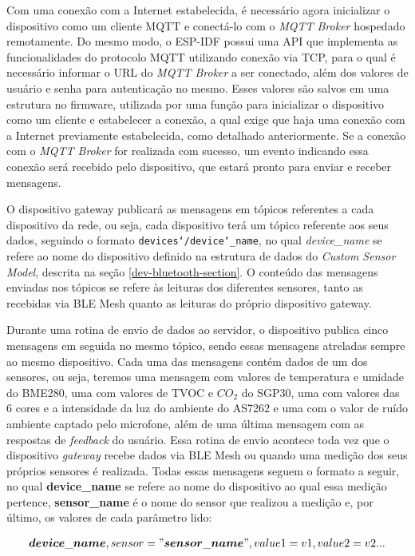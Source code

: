 \documentclass[../monografia.tex]{subfiles}
\begin{document}
Com uma conexão com a Internet estabelecida, é necessário agora inicializar o dispositivo como um cliente MQTT e conectá-lo com o \textit{MQTT Broker} hospedado remotamente. Do mesmo modo, o ESP-IDF possui uma API que implementa as funcionalidades do protocolo MQTT utilizando conexão via TCP, para o qual é necessário informar o URL do \textit{MQTT Broker} a ser conectado, além dos valores de usuário e senha para autenticação no mesmo. Esses valores são salvos em uma estrutura no firmware, utilizada por uma função para inicializar o dispositivo como um cliente e estabelecer a conexão, a qual exige que haja uma conexão com a Internet previamente estabelecida, como detalhado anteriormente. Se a conexão com o \textit{MQTT Broker} for realizada com sucesso, um evento indicando essa conexão será recebido pelo dispositivo, que estará pronto para enviar e receber mensagens.

O dispositivo gateway publicará as mensagens em tópicos referentes a cada dispositivo da rede, ou seja, cada dispositivo terá um tópico referente aos seus dados, seguindo o formato \texttt{devices\char`/device\char`_name}, no qual \textit{device\_name} se refere ao nome do dispositivo definido na estrutura de dados do \textit{Custom Sensor Model}, descrita na seção \ref{dev-bluetooth-section}. O conteúdo das mensagens enviadas nos tópicos se refere às leituras dos diferentes sensores, tanto as recebidas via BLE Mesh quanto as leituras do próprio dispositivo gateway.

Durante uma rotina de envio de dados ao servidor, o dispositivo publica cinco mensagens em seguida no mesmo tópico, sendo essas mensagens atreladas sempre ao mesmo dispositivo. Cada uma das mensagens contém dados de um dos sensores, ou seja, teremos uma mensagem com valores de temperatura e umidade do BME280, uma com valores de TVOC e $CO_{2}$ do SGP30, uma com valores das 6 cores e a intensidade da luz do ambiente do AS7262 e uma com o valor de ruído ambiente captado pelo microfone, além de uma última mensagem com as respostas de \textit{feedback} do usuário. Essa rotina de envio acontece toda vez que o dispositivo \textit{gateway} recebe dados via BLE Mesh ou quando uma medição dos seus próprios sensores é realizada. Todas essas mensagens seguem o formato a seguir, no qual \textbf{device\_name} se refere ao nome do dispositivo ao qual essa medição pertence, \textbf{sensor\_name} é o nome do sensor que realizou a medição e, por último, os valores de cada parâmetro lido:

\begin{align}
	\boldsymbol{device\_name},sensor="\boldsymbol{sensor\_name}", value1=v1,value2=v2 ... 
\end{align}
\end{document}
